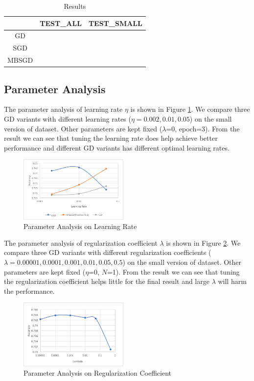 \documentclass[sigconf]{acmart}
\begin{document}
\begin{table}[t]
\centering
\caption{Results }
\label{res}
\begin{tabular}{c|c|c}
         &\bf TEST\_ALL &\bf TEST\_SMALL \\ \hline \hline
GD &  & \\
SGD &  & \\
MBSGD &  & 
\end{tabular}
\end{table}


\subsection{Parameter Analysis}
The parameter analysis of learning rate $\eta$ is shown in Figure \ref{lr}. We compare three GD variants with different learning rates ($\eta = 0.002, 0.01, 0.05$) on the small version of dataset. Other parameters are kept fixed ($\lambda$=0, epoch=3). From the result we can see that tuning the learning rate does help achieve better performance and different GD variants has different optimal learning rates.

\begin{figure}[ht]
\centering
\includegraphics[width=0.48\textwidth]{lr.png}
\caption{Parameter Analysis on Learning Rate}
\label{lr}
\end{figure}

The parameter analysis of regularization coefficient $\lambda$ is shown in Figure \ref{reg}. We compare three GD variants with different regularization coefficients ($\lambda = 0.00001, 0.0001, 0.001, 0.01, 0.05, 0.5$) on the small version of dataset. Other parameters are kept fixed ($\eta$=0, $N$=1). From the result we can see that tuning the regularization coefficient helps little for the final result and large $\lambda$ will harm the performance.

\begin{figure}[ht]
\centering
\includegraphics[width=0.48\textwidth]{reg.png}
\caption{Parameter Analysis on Regularization Coefficient}
\label{reg}
\end{figure}
\end{document}
